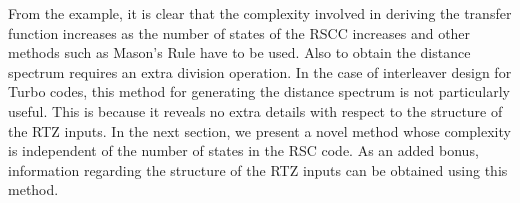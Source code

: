From the example, it is clear that the complexity involved in deriving the transfer function increases as the number of states of the RSCC increases and other methods such as Mason's Rule \cite{ref3} have to be used. Also to obtain the distance spectrum requires an extra division operation. In the case of interleaver design for Turbo codes, this method for generating the distance spectrum is not particularly useful. This is because it reveals no extra details with respect to the structure of the RTZ inputs. In the next section, we present a novel method whose complexity is independent of the number of states in the RSC code. As an added bonus, information regarding the structure of the RTZ inputs can be obtained using this method.